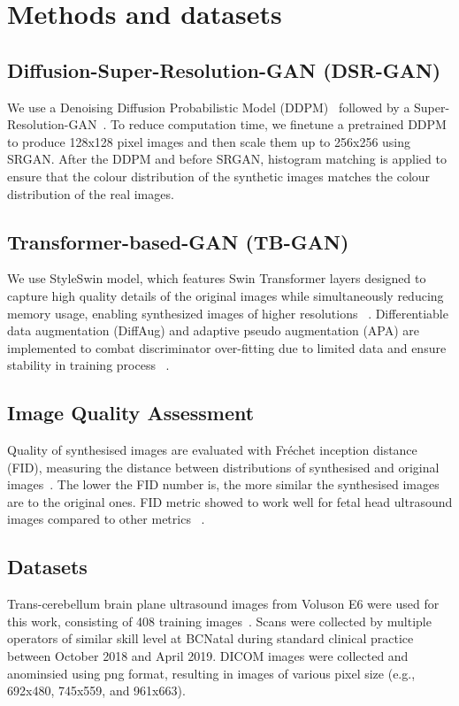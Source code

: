 \documentclass{midl} %
\begin{document}
\section{Methods and datasets}
\subsection{Diffusion-Super-Resolution-GAN (DSR-GAN)}
We use a Denoising Diffusion Probabilistic Model (DDPM)~\citep{ho2020_neurips} followed by a Super-Resolution-GAN~\citep{Ledig_2017_CVPR}.  To reduce computation time, we finetune a pretrained DDPM to produce 128x128 pixel images and then scale them up to 256x256 using SRGAN.  After the DDPM and before SRGAN, histogram matching \citep{castleman1996digital} is applied to ensure that the colour distribution of the synthetic images matches the colour distribution of the real images.

\subsection{Transformer-based-GAN (TB-GAN)}
We use StyleSwin model, which features Swin Transformer layers designed to capture high quality details of the original images while simultaneously reducing memory usage, enabling synthesized images of higher resolutions ~\cite{Zhang_2022_CVPR}. Differentiable data augmentation (DiffAug) and adaptive pseudo augmentation (APA) are implemented to combat discriminator over-fitting due to limited data and ensure stability in training process ~\cite{zhao2020differentiable, jiang2021deceive}.

\subsection{Image Quality Assessment}
Quality of synthesised images are evaluated with Fr\'echet inception distance (FID), measuring the distance between distributions of synthesised  and original images~\citep{Heusel2017}. 
The lower the FID number is, the more similar the synthesised images are to the original ones. 
FID metric showed to work well for fetal head ultrasound images compared to other metrics ~\cite{Bautista2022}.

\subsection{Datasets}
Trans-cerebellum brain plane ultrasound images from Voluson E6 were used for this work, consisting of 408 training images~\citep{Burgos-Artizzu2020, Burgos-Artizzu2020-1}.
Scans were collected by multiple operators of similar skill level at BCNatal during standard clinical practice between October 2018 and April 2019. 
DICOM images were collected and anominsied using png format, resulting in images of various pixel size (e.g., 692x480, 745x559, and 961x663).
\end{document}
